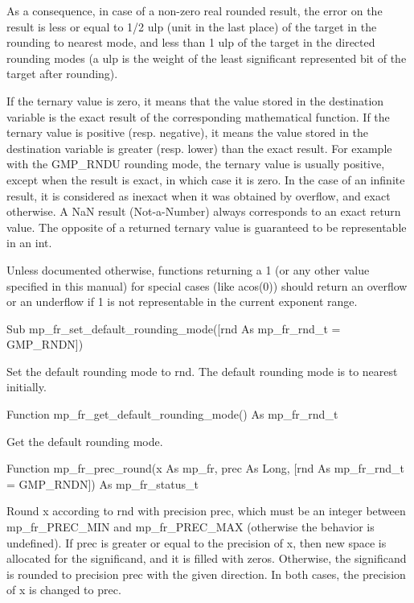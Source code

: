 \vspace{0.3cm}
As a consequence, in case of a non-zero real rounded result, the error on the result is less or equal to 1/2 ulp (unit in the last place) of the target in the rounding to nearest mode, and less than 1 ulp of the target in the directed rounding modes (a ulp is the weight of the least significant represented bit of the target after rounding). 

\vspace{0.3cm}
If the ternary value is zero, it means that the value stored in the destination variable is the exact result of the corresponding mathematical function. If the ternary value is positive (resp. negative), it means the value stored in the destination variable is greater (resp. lower) than the exact result. For example with the GMP\_RNDU rounding mode, the ternary value is usually positive, except when the result is exact, in which case it is zero. In the case of an infinite result, it is considered as inexact when it was obtained by overflow, and exact otherwise. A NaN result (Not-a-Number) always corresponds to an exact return value. The opposite of a returned ternary value is guaranteed to be representable in an int. 

\vspace{0.3cm}
Unless documented otherwise, functions returning a 1 (or any other value specified in this manual) for special cases (like acos(0)) should return an overflow or an underflow if 1 is not representable in the current exponent range. 

\vspace{0.3cm}
Sub mp\_fr\_set\_default\_rounding\_mode([rnd As mp\_fr\_rnd\_t = GMP\_RNDN]) 

Set the default rounding mode to rnd. The default rounding mode is to nearest initially. 

\vspace{0.3cm}
Function mp\_fr\_get\_default\_rounding\_mode() As mp\_fr\_rnd\_t 

Get the default rounding mode. 

\vspace{0.3cm}
Function mp\_fr\_prec\_round(x As mp\_fr, prec As Long, [rnd As mp\_fr\_rnd\_t = GMP\_RNDN]) As mp\_fr\_status\_t 

Round x according to rnd with precision prec, which must be an integer between mp\_fr\_PREC\_MIN and mp\_fr\_PREC\_MAX (otherwise the behavior is undefined). If prec is greater or equal to the precision of x, then new space is allocated for the significand, and it is filled with zeros. Otherwise, the significand is rounded to precision prec with the given direction. In both cases, the precision of x is changed to prec. 

